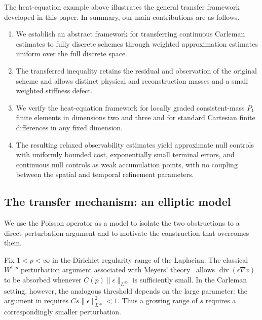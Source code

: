 \documentclass[print,wide,eng]{draft}
\begin{document}
The heat-equation example above illustrates the general transfer framework developed in this paper. In summary, our main contributions are as follows.
%
\begin{enumerate}[itemsep=3pt]
\item We establish an abstract framework for transferring continuous Carleman estimates to fully discrete schemes through weighted approximation estimates uniform over the full discrete space.
\item The transferred inequality retains the residual and observation of the original scheme and allows distinct physical and reconstruction masses and a small weighted stiffness defect.
\item We verify the heat-equation framework for locally graded consistent-mass $P_1$ finite elements in dimensions two and three and for standard Cartesian finite differences in any fixed dimension.
\item The resulting relaxed observability estimates yield approximate null controls with uniformly bounded cost, exponentially small terminal errors, and continuous null controls as weak accumulation points, with no coupling between the spatial and temporal refinement parameters.
\end{enumerate}
%

\subsection{The transfer mechanism: an elliptic model}\label{sec:elliptic-transfer}

We use the Poisson operator as a model to isolate the two obstructions to a direct perturbation argument and to motivate the construction that overcomes them.

Fix $1<p<\infty$ in the Dirichlet regularity range of the Laplacian. The classical $W^{1,p}$ perturbation argument associated with Meyers' theory~\cite{Meyers1963} allows $\operatorname{div}(\epsilon\nabla v)$ to be absorbed whenever $C(p)\|\epsilon\|_{L^\infty}$ is sufficiently small. In the Carleman setting, however, the analogous threshold depends on the large parameter: the argument in \cite[Section~6.1, (6.5)]{Zuazua2007} requires $Cs\|\epsilon\|_{L^\infty}^2<1$. Thus a growing range of $s$ requires a correspondingly smaller perturbation.
\end{document}

